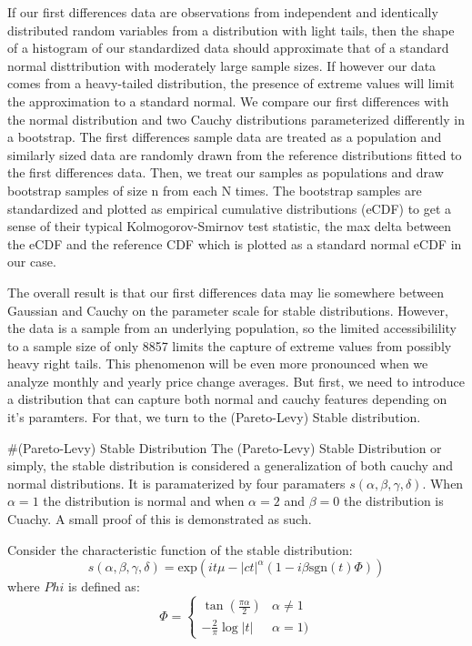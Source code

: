 \documentclass[]{article}
\begin{document}
If our first differences data are observations from independent and
identically distributed random variables from a distribution with light
tails, then the shape of a histogram of our standardized data should
approximate that of a standard normal disttribution with moderately
large sample sizes. If however our data comes from a heavy-tailed
distribution, the presence of extreme values will limit the
approximation to a standard normal. We compare our first differences
with the normal distribution and two Cauchy distributions parameterized
differently in a bootstrap. The first differences sample data are
treated as a population and similarly sized data are randomly drawn from
the reference distributions fitted to the first differences data. Then,
we treat our samples as populations and draw bootstrap samples of size n
from each N times. The bootstrap samples are standardized and plotted as
empirical cumulative distributions (eCDF) to get a sense of their
typical Kolmogorov-Smirnov test statistic, the max delta between the
eCDF and the reference CDF which is plotted as a standard normal eCDF in
our case.

The overall result is that our first differences data may lie somewhere
between Gaussian and Cauchy on the parameter scale for stable
distributions. However, the data is a sample from an underlying
population, so the limited accessibilility to a sample size of only 8857
limits the capture of extreme values from possibly heavy right tails.
This phenomenon will be even more pronounced when we analyze monthly and
yearly price change averages. But first, we need to introduce a
distribution that can capture both normal and cauchy features depending
on it's paramters. For that, we turn to the (Pareto-Levy) Stable
distribution.

\#(Pareto-Levy) Stable Distribution The (Pareto-Levy) Stable
Distribution or simply, the stable distribution is considered a
generalization of both cauchy and normal distributions. It is
paramaterized by four paramaters \(s(\alpha, \beta, \gamma, \delta)\).
When \(\alpha = 1\) the distribution is normal and when \(\alpha = 2\)
and \(\beta = 0\) the distribution is Cuachy. A small proof of this is
demonstrated as such.

Consider the characteristic function of the stable distribution:
\[s(\alpha, \beta, \gamma, \delta)  = \text{exp}(it\mu - |ct|^{\alpha} (1 - i \beta \text{sgn}(t) \Phi))\]
where \(Phi\) is defined as:
\[\Phi = \begin{cases} \tan(\frac{\pi \alpha}{2}) & \alpha \neq 1 \\ -\frac{2}{\pi} \log |t| & \alpha = 1) \end{cases}\]
\end{document}
